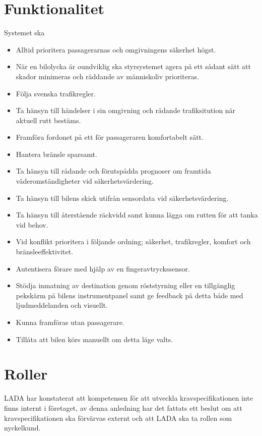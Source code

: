 \documentclass[10pt]{article}
\begin{document}
\section{Funktionalitet}
\sloppy
\noindent Systemet ska
\begin{itemize}
	\setlength\itemsep{0.1em}
	\item Alltid prioritera passagerarnas och omgivningens säkerhet högst.
	\item När en bilolycka är oundviklig ska styrsystemet agera på ett sådant sätt att skador minimeras och räddande av människoliv prioriteras.
	\item Följa svenska trafikregler.
	\item Ta hänsyn till händelser i sin omgivning och rådande trafiksitution  när aktuell rutt bestäms.
	\item Framföra fordonet på ett för passageraren komfortabelt sätt.
	\item Hantera bränsle sparsamt.
	\item Ta hänsyn till rådande och förutspådda prognoser om framtida väderomständigheter vid säkerhetsvärdering.
	\item Ta hänsyn till bilens skick utifrån sensordata vid säkerhetsvärdering.
	\item Ta hänsyn till återstående räckvidd samt kunna lägga om rutten för att tanka vid behov.
	\item Vid konflikt prioritera i följande ordning; säkerhet, trafikregler, komfort och bränsleeffektivitet.
	\item Autentisera förare med hjälp av en fingeravtryckssensor.
	\item Stödja inmatning av destination genom röststyrning eller en tillgänglig pekskärm på bilens instrumentpanel samt ge feedback på detta både med ljudmeddelanden och visuellt.
	\item Kunna framföras utan passagerare.
	\item Tillåta att bilen körs manuellt om detta läge valts.
\end{itemize}


\section{Roller}
\sloppy
\noindent LADA har konstaterat att kompetensen för att utveckla kravspecifikationen inte finns internt i företaget, av denna anledning har det fattats ett beslut om att kravspecifikationen ska  förvärvas externt och att LADA ska ta rollen som nyckelkund.
\end{document}
